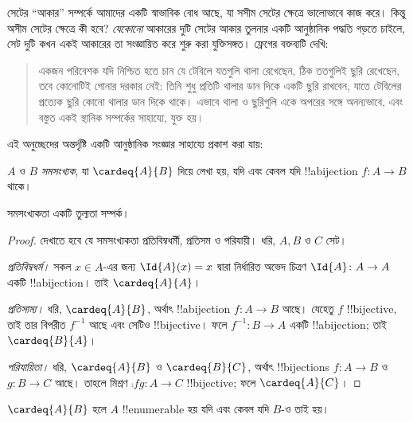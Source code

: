 \documentclass[../../../include/open-logic-section]{subfiles}
\begin{document}


সেটের ``আকার'' সম্পর্কে আমাদের একটি স্বাভাবিক বোধ আছে, যা সসীম সেটের ক্ষেত্রে ভালোভাবে কাজ করে। কিন্তু অসীম সেটের ক্ষেত্রে কী হবে? \emph{যেকোনো} আকারের দুটি সেটের আকার তুলনার একটি আনুষ্ঠানিক পদ্ধতি গড়তে চাইলে, সেট দুটি কখন একই আকারের তা সংজ্ঞায়িত করে শুরু করা যুক্তিসঙ্গত। ফ্রেগের বক্তব্যটি দেখি:
\begin{quote}
  একজন পরিবেশক যদি নিশ্চিত হতে চান যে টেবিলে যতগুলি থালা রেখেছেন, ঠিক ততগুলিই ছুরি রেখেছেন, তবে কোনোটিই গোনার দরকার নেই: তিনি শুধু প্রতিটি থালার ডান দিকে একটি ছুরি রাখবেন, যাতে টেবিলের প্রত্যেক ছুরি কোনো থালার ডান দিকে থাকে। এভাবে থালা ও ছুরিগুলি একে অপরের সঙ্গে অনন্যভাবে, এবং বস্তুত একই স্থানিক সম্পর্কের সাহায্যে, যুক্ত হয়। \citep[\S70]{Frege1884}
\end{quote}
এই অনুচ্ছেদের অন্তর্দৃষ্টি একটি আনুষ্ঠানিক সংজ্ঞার সাহায্যে প্রকাশ করা যায়:

\begin{defn}
  $A$ ও $B$ \emph{সমসংখ্যক}, যা $\cardeq{A}{B}$ দিয়ে লেখা হয়, যদি এবং কেবল যদি !!a{bijection} $f \colon A \to B$ থাকে।
\end{defn}

\begin{prop}
সমসংখ্যকতা একটি তুল্যতা সম্পর্ক।
\end{prop}

\begin{proof}
দেখাতে হবে যে সমসংখ্যকতা প্রতিবিম্বধর্মী, প্রতিসম ও পরিযায়ী। ধরি, $A, B$ ও $C$ সেট।

\emph{প্রতিবিম্বধর্ম।} সকল $x \in A$-এর জন্য $\Id{A} (x) = x$ দ্বারা নির্ধারিত অভেদ চিত্রণ $\Id{A} \colon A \to A$ একটি !!a{bijection}। তাই $\cardeq{A}{A}$।

\emph{প্রতিসাম্য।} ধরি, $\cardeq{A}{B}$, অর্থাৎ !!a{bijection} $f\colon A \to B$ আছে। যেহেতু $f$ !!{bijective}, তাই তার বিপরীত $f^{-1}$ আছে এবং সেটিও !!{bijective}। ফলে $f^{-1}\colon B \to A$ একটি !!a{bijection}; তাই $\cardeq{B}{A}$।

\emph{পরিযায়িতা।} ধরি, $\cardeq{A}{B}$ ও $\cardeq{B}{C}$, অর্থাৎ !!{bijection}s $f\colon A \to B$ ও $g\colon B \to C$ আছে। তাহলে মিশ্রণ $\comp{f}{g}\colon A \to C$ !!{bijective}; ফলে $\cardeq{A}{C}$।
\end{proof}

\begin{prop}
$\cardeq{A}{B}$ হলে $A$ !!{enumerable} হয় যদি এবং কেবল যদি $B$-ও তাই হয়।
\end{prop}
\end{document}
